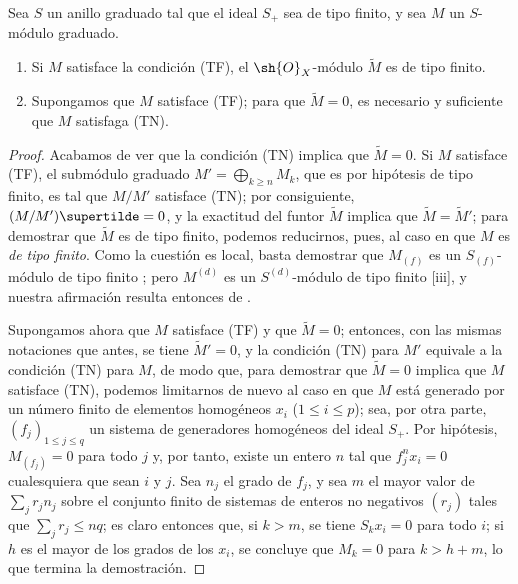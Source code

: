 \documentclass[oneside,10pt]{amsart}
\renewcommand{\leq}{\leqslant}
\renewcommand{\geq}{\geqslant}
\newcommand{\oldpage}[2][]{\marginnote{\normalfont\footnotesize\textbf{#1}~|~#2}\ignorespaces}
\let\EGAOriginalLabel\label
\renewcommand{\label}[1]{\phantomsection\EGAOriginalLabel{#1}}
\begin{document}
\begin{proposition}[2.7.3]
\label{II.2.7.3}
Sea $S$ un anillo graduado tal que el ideal $S_+$ sea de tipo finito, y sea $M$ un $S$-módulo graduado.
\begin{enumerate}
  \item[{\rm(i)}] Si $M$ satisface la condición \textup{(TF)}, el $\sh{O}_X$-módulo $\widetilde{M}$ es de tipo finito.
  \item[{\rm(ii)}] Supongamos que $M$ satisface \textup{(TF)}; para que $\widetilde{M}=0$, es necesario y suficiente que $M$ satisfaga \textup{(TN)}.
\end{enumerate}
\end{proposition}

\begin{proof}
Acabamos de ver que la condición (TN) implica que $\widetilde{M}=0$.
Si $M$ satisface (TF), el submódulo graduado $M'=\bigoplus_{k\geq n}M_k$, que es por hipótesis de tipo finito, es tal que $M/M'$ satisface (TN); por consiguiente, $(M/M')\supertilde=0$, y la exactitud del funtor $\widetilde{M}$  implica que $\widetilde{M}=\widetilde M'$; para demostrar que $\widetilde{M}$ es de tipo finito, podemos reducirnos, pues, al caso en que $M$ es \emph{de tipo finito}.
Como la cuestión es local, basta demostrar que $M_{(f)}$ es un $S_{(f)}$-módulo de tipo finito ; pero $M^{(d)}$ es un $S^{(d)}$-módulo de tipo finito [iii], y nuestra afirmación resulta entonces de .

Supongamos ahora que $M$ satisface (TF) y que $\widetilde{M}=0$; entonces, con las mismas notaciones que antes, se tiene $\widetilde M'=0$, y la condición (TN) para $M'$ equivale a la condición (TN) para $M$, de modo que, para demostrar que $\widetilde{M}=0$ implica que $M$ satisface (TN), podemos limitarnos de nuevo al caso en que $M$ está generado por un número finito de elementos homogéneos $x_i$ ($1\leq i\leq p$); sea, por otra parte, $(f_j)_{1\leq j\leq q}$ un sistema de generadores homogéneos del ideal $S_+$.
Por hipótesis, $M_{(f_j)}=0$ para todo $j$ y, por tanto, existe un entero $n$ tal que $f_j^nx_i=0$ cualesquiera que sean $i$ y $j$.
Sea $n_j$ el grado de $f_j$, y sea $m$ el mayor valor de $\sum_j r_jn_j$ sobre el conjunto finito de sistemas de enteros no negativos $(r_j)$ tales que $\sum_jr_j\leq nq$; es claro entonces
\oldpage[II]{40}
que, si $k>m$, se tiene $S_kx_i=0$ para todo $i$; si $h$ es el mayor de los grados de los $x_i$, se concluye que $M_k=0$ para $k>h+m$, lo que termina la demostración.
\end{proof}
\end{document}
